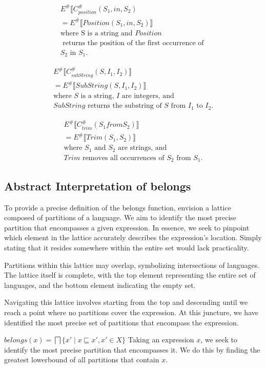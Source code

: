 \begin{align*}
    E^\# \llbracket C_{position}^\# (S_1, in, S_2) \\
    = E^\# \llbracket Position(S_1, in, S_2) \rrbracket \\
    \text{where S is a string and } Position \\
    \text{ returns the position of the first occurrence of } \\
    S_2 \text{ in } S_1.
\end{align*}

\begin{align*}
    E^\# \llbracket C_{subString}^\# (S, I_1, I_2) \rrbracket \\
    = E^\# \llbracket SubString(S, I_1, I_2) \rrbracket \\
    \text{where } S \text{ is a string, } I \text{ are integers, and } \\
    SubString \text{ returns the substring of } S \text{ from } I_1 \text{ to } I_2.
\end{align*}

\begin{align*}
    E^\# \llbracket C_{trim}^\# (S_1 from S_2) \rrbracket \\
    = E^\# \llbracket Trim(S_1, S_2) \rrbracket \\
    \text{where } S_1 \text{ and } S_2 \text{ are strings, and }\\
    Trim \text{ removes all occurrences of } S_2 \text{ from } S_1.
\end{align*}




\subsection{Abstract Interpretation of belongs}
To provide a precise definition of the belongs function, envision a lattice composed of partitions of a language. We aim to identify the most precise partition that encompasses a given expression. In essence, we seek to pinpoint which element in the lattice accurately describes the expression's location. Simply stating that it resides somewhere within the entire set would lack practicality.

Partitions within this lattice may overlap, symbolizing intersections of languages. The lattice itself is complete, with the top element representing the entire set of languages, and the bottom element indicating the empty set.

Navigating this lattice involves starting from the top and descending until we reach a point where no partitions cover the expression. At this juncture, we have identified the most precise set of partitions that encompass the expression.

$ belongs(x)=\bigsqcap\{x' \mid x \sqsubseteq x', x' \in X\} $
Taking an expression $x$, we seek to identify the most precise partition that encompasses it. We do this by finding the greatest lowerbound of all partitions that contain $x$.

